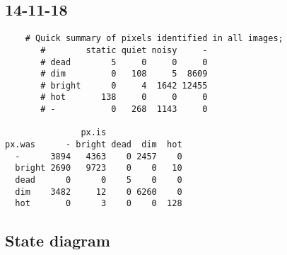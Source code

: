 \documentclass[10pt,fleqn]{article}
\begin{document}
\subsection*{14-11-18}
\begin{footnotesize}
\begin{verbatim}
	# Quick summary of pixels identified in all images;		
       #        static quiet noisy     -						
       # dead        5     0     0     0
       # dim         0   108     5  8609
       # bright      0     4  1642 12455
       # hot       138     0     0     0
       # -           0   268  1143     0
       
               px.is
px.was      - bright dead  dim  hot
  -      3894   4363    0 2457    0
  bright 2690   9723    0    0   10
  dead      0      0    5    0    0
  dim    3482     12    0 6260    0
  hot       0      3    0    0  128
\end{verbatim}
\end{footnotesize}

\subsection*{State diagram}



 
\end{document}
